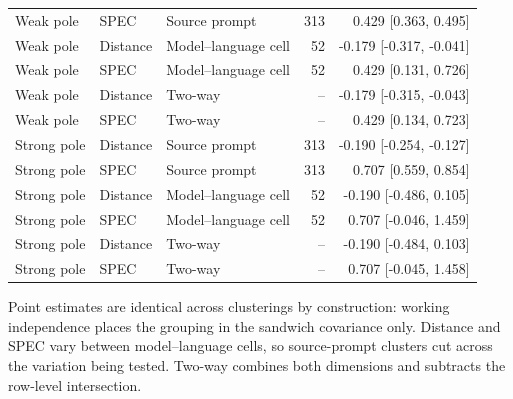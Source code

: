 {\begin{table}[htbp]
\begin{tabularx}{\linewidth}{llXrr}
Weak pole & SPEC & Source prompt & 313 & 0.429 [0.363, 0.495] \\
Weak pole & Distance & Model--language cell & 52 & -0.179 [-0.317, -0.041] \\
Weak pole & SPEC & Model--language cell & 52 & 0.429 [0.131, 0.726] \\
Weak pole & Distance & Two-way & -- & -0.179 [-0.315, -0.043] \\
Weak pole & SPEC & Two-way & -- & 0.429 [0.134, 0.723] \\
Strong pole & Distance & Source prompt & 313 & -0.190 [-0.254, -0.127] \\
Strong pole & SPEC & Source prompt & 313 & 0.707 [0.559, 0.854] \\
Strong pole & Distance & Model--language cell & 52 & -0.190 [-0.486, 0.105] \\
Strong pole & SPEC & Model--language cell & 52 & 0.707 [-0.046, 1.459] \\
Strong pole & Distance & Two-way & -- & -0.190 [-0.484, 0.103] \\
Strong pole & SPEC & Two-way & -- & 0.707 [-0.045, 1.458] \\
\bottomrule\end{tabularx}
\par\smallskip\footnotesize Point estimates are identical across clusterings by construction: working independence places the grouping in the sandwich covariance only. Distance and SPEC vary between model--language cells, so source-prompt clusters cut across the variation being tested. Two-way combines both dimensions and subtracts the row-level intersection.
\end{table}
}

